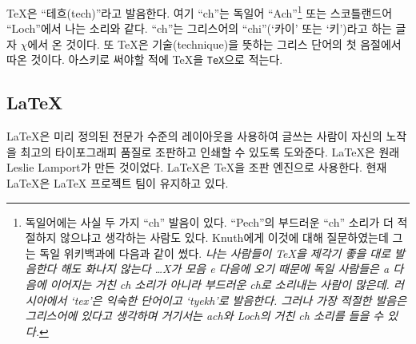 \TeX 은 ``테흐(tech)''라고 발음한다.
여기 ``ch''는 독일어 ``Ach''\footnote{%
  독일어에는 사실 두 가지 ``ch'' 발음이 있다. ``Pech''의 부드러운 ``ch'' 소리가 더 적절하지
  않으냐고 생각하는 사람도 있다. Knuth에게 이것에 대해 질문하였는데 그는 독일 위키백과에 다음과 같이 썼다.
  \emph{나는 사람들이 \TeX 을 제각기 좋을 대로 발음한다 해도 화나지 않는다 \ldots X가 모음 e 다음에 오기
  때문에 독일 사람들은 a 다음에 이어지는 거친 ch 소리가 아니라 부드러운 ch로 소리내는 사람이 많은데.
  러시아에서 `tex'은 익숙한 단어이고 `tyekh'로 발음한다. 그러나 가장 적절한 발음은 그리스어에 있다고 생각하며
  거기서는 ach와 Loch의 거친 ch 소리를 들을 수 있다.}}
또는 스코틀랜드어 ``Loch''에서
나는 소리와 같다. ``ch''는 그리스어의 ``chi''(`카이' 또는 `키')라고 하는 글자 $\chi$에서 온 것이다.
또 \TeX 은 기술(technique)을 뜻하는 그리스 단어의 첫 음절에서 따온 것이다.
아스키로 써야할 적에 \TeX 을 \texttt{TeX}으로 적는다.

\subsection{\LaTeX}

\LaTeX 은 미리 정의된 전문가 수준의 레이아웃을 사용하여 글쓰는 사람이 자신의 노작을 
최고의 타이포그래피 품질로 조판하고 인쇄할 수 있도록 도와준다.
\LaTeX 은 원래 Leslie Lamport가 만든 것이었다\cite{manual}.
\LaTeX 은 \TeX 을 조판 엔진으로 사용한다. 현재 \LaTeX 은 \LaTeX{} 프로젝트 팀이
유지하고 있다.

